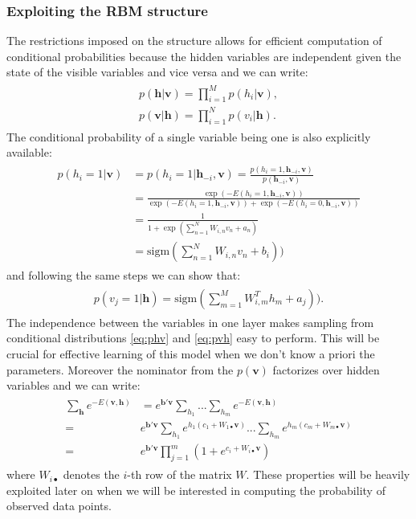 \subsubsection{Exploiting the RBM structure}
The restrictions imposed on the structure allows for efficient computation of conditional probabilities because the hidden variables are independent given the state of the visible variables and vice versa and we can write:
\begin{align}
\begin{split}
p(\mathbf{h}| \mathbf{v}) = \prod_{i = 1}^{M} p(h_i |\mathbf{v}), \\
p(\mathbf{v}| \mathbf{h}) = \prod_{i = 1}^{N} p(v_i |\mathbf{h}).
\end{split}
\end{align}
The conditional probability of a single variable being one is also explicitly available: 
\begin{align}
\begin{split}
p(h_i = 1| \mathbf{v})& = p(h_i = 1| \mathbf{h}_{-i}, \mathbf{v}) = \frac{p(h_i = 1, \mathbf{h}_{-i}, \mathbf{v})}{p( \mathbf{h}_{-i}, \mathbf{v})} \\
& = \frac{\exp( -E(h_i=1,\mathbf{h}_{-i}, \mathbf{v})) }{\exp( -E(h_i=1,\mathbf{h}_{-i}, \mathbf{v})) + \exp( -E(h_i=0,\mathbf{h}_{-i}, \mathbf{v}))}\\
& = \frac{1}{1 + \exp( \sum_{n=1}^N W_{i,n} v_n + a_n)}\\
& = \text{sigm} (\sum_{n=1}^N W_{i,n} v_n + b_i))
\end{split}
\label{eq:phv}
\end{align}
and following the same steps we can show that:
 \begin{align}
\begin{split}
p(v_j = 1| \mathbf{h})=  \text{sigm} (\sum_{m=1}^M W^T_{i,m} h_m + a_j)).
\end{split}
\label{eq:pvh}
\end{align}
The independence between the variables in one layer makes sampling from conditional distributions \ref{eq:phv} and \ref{eq:pvh} easy to perform. This will be crucial for effective learning of this model when we don't know a priori the parameters. Moreover the nominator from the $p(\mathbf{v})$ factorizes over hidden variables and we can write:
\begin{align}
\begin{split}
 \sum_\mathbf{h} e^{-E(\mathbf{v}, \mathbf{h})} & = e^{\mathbf{b}'\mathbf{v}}\sum_{h_1}...\sum_{h_m}e^{-E(\mathbf{v}, \mathbf{h})} \\
=&  e^{\mathbf{b}'\mathbf{v}} \sum_{h_1} e^{h_1 (c_1 + W_{1\bullet}\mathbf{v})}... \sum_{h_m} e^{h_m (c_m + W_{m\bullet}\mathbf{v})} \\
= & e^{\mathbf{b}'\mathbf{v}} \prod_{j=1}^{m} \left( 1 + e^{c_i + W_{i\bullet}\mathbf{v}} \right)
\label{eq:clampedFreeEnergy}
\end{split}
\end{align}
where $W_{i\bullet}$ denotes the $i$-th row of the matrix $W$. These properties will be heavily exploited later on when we will be interested in computing the probability of observed data points. 
